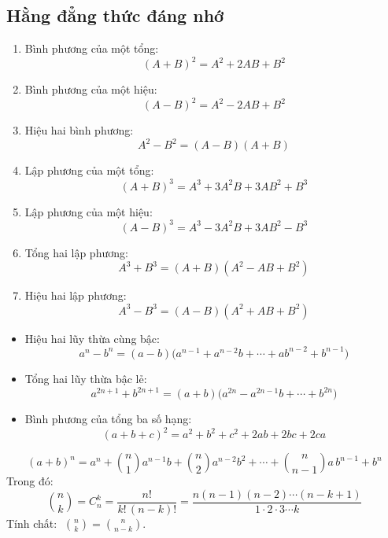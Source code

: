 \documentclass[12pt,a4paper]{article}
\begin{document}
\subsection{Hằng đẳng thức đáng nhớ}

\begin{congthuc}[title={Bảy hằng đẳng thức đáng nhớ}]
  \begin{enumerate}
    \item Bình phương của một tổng:
      \[ (A + B)^2 = A^2 + 2AB + B^2 \]
    \item Bình phương của một hiệu:
      \[ (A - B)^2 = A^2 - 2AB + B^2 \]
    \item Hiệu hai bình phương:
      \[ A^2 - B^2 = (A - B)(A + B) \]
    \item Lập phương của một tổng:
      \[ (A + B)^3 = A^3 + 3A^2B + 3AB^2 + B^3 \]
    \item Lập phương của một hiệu:
      \[ (A - B)^3 = A^3 - 3A^2B + 3AB^2 - B^3 \]
    \item Tổng hai lập phương:
      \[ A^3 + B^3 = (A + B)(A^2 - AB + B^2) \]
    \item Hiệu hai lập phương:
      \[ A^3 - B^3 = (A - B)(A^2 + AB + B^2) \]
  \end{enumerate}
\end{congthuc}

\begin{congthuc}[title={Một số hằng đẳng thức tổng quát \normalfont\textit{(Nâng cao)}}]
  \begin{itemize}
    \item Hiệu hai lũy thừa cùng bậc:
      \[ a^n - b^n = (a - b)\bigl(a^{n-1} + a^{n-2}b + \cdots + ab^{n-2} + b^{n-1}\bigr) \]
    \item Tổng hai lũy thừa bậc lẻ:
      \[ a^{2n+1} + b^{2n+1} = (a + b)\bigl(a^{2n} - a^{2n-1}b + \cdots + b^{2n}\bigr) \]
    \item Bình phương của tổng ba số hạng:
      \[ (a + b + c)^2 = a^2 + b^2 + c^2 + 2ab + 2bc + 2ca \]
  \end{itemize}
\end{congthuc}

\begin{congthuc}[title={Nhị thức Newton \normalfont\textit{(Nâng cao)}}]
  \[
    (a + b)^n = a^n + \binom{n}{1}a^{n-1}b + \binom{n}{2}a^{n-2}b^2 + \cdots + \binom{n}{n-1}a\,b^{n-1} + b^n
  \]
  Trong đó:
  \[
    \binom{n}{k} = C_n^k = \frac{n!}{k!\,(n-k)!}
    = \frac{n(n-1)(n-2)\cdots(n-k+1)}{1 \cdot 2 \cdot 3 \cdots k}
  \]
  Tính chất: $\;\binom{n}{k} = \binom{n}{n-k}$.
\end{congthuc}
\end{document}
